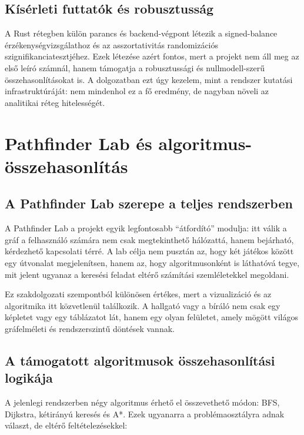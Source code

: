 \documentclass[a4paper,12pt]{report}
\begin{document}
\section{Kísérleti futtatók és robusztusság}

A Rust rétegben külön parancs és backend-végpont létezik a signed-balance érzékenységvizsgálathoz és az asszortativitás randomizációs szignifikanciatesztjéhez. Ezek létezése azért fontos, mert a projekt nem áll meg az első leíró számnál, hanem támogatja a robusztussági és nullmodell-szerű összehasonlításokat is. A dolgozatban ezt úgy kezelem, mint a rendszer kutatási infrastruktúráját: nem mindenhol ez a fő eredmény, de nagyban növeli az analitikai réteg hitelességét.

\chapter{Pathfinder Lab és algoritmus-összehasonlítás}

\section{A Pathfinder Lab szerepe a teljes rendszerben}

A Pathfinder Lab a projekt egyik legfontosabb ``átfordító'' modulja: itt válik a gráf a felhasználó számára nem csak megtekinthető hálózattá, hanem bejárható, kérdezhető kapcsolati térré. A lab célja nem pusztán az, hogy két játékos között egy útvonalat megjelenítsen, hanem az, hogy algoritmusonként is láthatóvá tegye, mit jelent ugyanaz a keresési feladat eltérő számítási szemléletekkel megoldani.

Ez szakdolgozati szempontból különösen értékes, mert a vizualizáció és az algoritmika itt közvetlenül találkozik. A hallgató vagy a bíráló nem csak egy képletet vagy egy táblázatot lát, hanem egy olyan felületet, amely mögött világos gráfelméleti és rendszerszintű döntések vannak.

\section{A támogatott algoritmusok összehasonlítási logikája}

A jelenlegi rendszerben négy algoritmus érhető el összevethető módon: BFS, Dijkstra, kétirányú keresés és A*. Ezek ugyanarra a problémaosztályra adnak választ, de eltérő feltételezésekkel:
\end{document}
